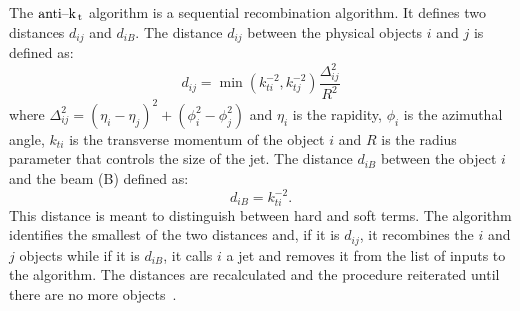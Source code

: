The $\text{anti--k}_\mathrm{\, t}$ algorithm is a sequential recombination algorithm. It defines two
distances $d_{ij}$ and $d_{iB}$. The distance $d_{ij}$ between the physical
objects $i$ and $j$ is defined as:
\begin{equation}
  \label{eq:80}
  d_{ij} = \min(k_{ti}^{-2}, k_{tj}^{-2}) \frac{\Delta_{ij}^2}{R^2}
\end{equation}
where $\Delta_{ij}^2 = (\eta_i - \eta_j)^2 + (\phi_i^2 - \phi_j^2)$ and $\eta_i$
is the rapidity, $\phi_i$ is the azimuthal angle, $k_{ti}$ is the transverse
momentum of the object $i$ and $R$ is the radius parameter that controls the
size of the jet. The distance $d_{iB}$ between the object $i$ and the beam (B)
defined as:
\begin{equation}
  \label{eq:81}
  d_{iB} = k_{ti}^{-2}.
\end{equation}
This distance is meant to distinguish between hard and soft terms. The algorithm
identifies the smallest of the two distances and, if it is $d_{ij}$, it
recombines the $i$ and $j$ objects while if it is $d_{iB}$, it calls $i$ a jet
and removes it from the list of inputs to the algorithm. The distances are
recalculated and the procedure reiterated until there are no more
objects~\cite{Antikt}.
